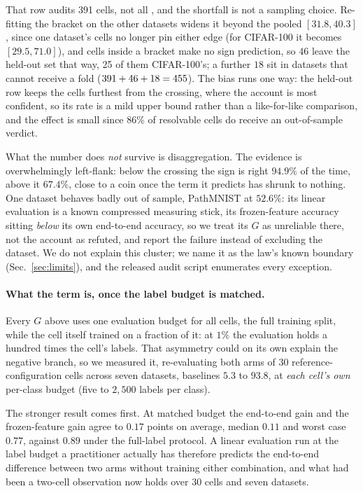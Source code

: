 That row audits 391 cells, not all \auditResolvable{}, and the shortfall is not
a sampling choice. Re-fitting the bracket on the other datasets widens it
beyond the pooled $[31.8, 40.3]$, since one dataset's cells no longer pin
either edge (for CIFAR-100 it becomes $[29.5, 71.0]$), and cells inside a
bracket make no sign prediction, so $46$ leave the held-out set that way, 25 of
them CIFAR-100's; a further $18$ sit in datasets that cannot receive a fold
($391 + 46 + 18 = 455$). The bias runs one way: the held-out row
keeps the cells furthest from the crossing, where the account is most
confident, so its rate is a mild upper bound rather than a like-for-like
comparison, and the effect is small since $86\%$ of resolvable cells do receive
an out-of-sample verdict.

What the number does \emph{not} survive is disaggregation. The evidence is
overwhelmingly left-flank: below the crossing the sign is right $94.9\%$ of the
time, above it $67.4\%$, close to a coin once the term it predicts has shrunk
to nothing. One dataset behaves badly out of sample, PathMNIST at $52.6\%$: its
linear evaluation is a known compressed measuring stick, its frozen-feature
accuracy sitting \emph{below} its own end-to-end accuracy, so we treat its
$G$ as unreliable there, not the account as refuted, and report the failure
instead of excluding the dataset. We do not explain this cluster; we name it
as the law's known boundary (Sec.~\ref{sec:limits}), and the released audit
script enumerates every exception.

\paragraph{What the \readout{} term is, once the label budget is matched.} Every
$G$ above uses one evaluation budget for all cells, the full training split,
while the cell itself trained on a fraction of it: at $1\%$ the evaluation
holds a hundred times the cell's labels. That asymmetry could on its own
explain the negative branch, so we measured it, re-evaluating both arms of $30$
reference-configuration cells across seven datasets, baselines $5.3$ to $93.8$, at \emph{each
cell's own} per-class budget (five to $2{,}500$ labels per class).

The stronger result comes first. At matched budget the end-to-end gain and the
frozen-feature gain agree to $0.17$ points on average, median $0.11$ and worst
case $0.77$, against $0.89$ under the full-label protocol. A linear evaluation
run at the label budget a practitioner actually has therefore predicts the
end-to-end difference between two arms without training either combination, and
what had been a two-cell observation now holds over $30$ cells and seven
datasets.


